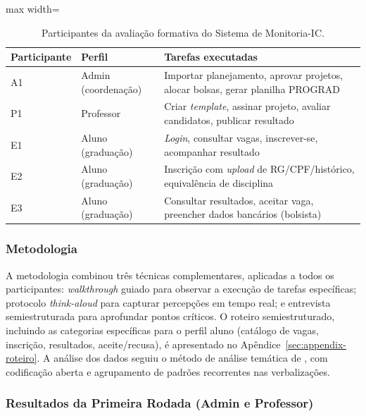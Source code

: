 \documentclass[portuguese]{sbc2025}%
\begin{document}
\begin{table}[!htbp]
  \centering
  \small
  \caption{Participantes da avaliação formativa do Sistema de Monitoria-IC.}
  \label{tab:participantes}
  \begin{adjustbox}{max width=\columnwidth}
    \begin{tabular}{|l|l|p{4.3cm}|}
      \hline
      \textbf{Participante} & \textbf{Perfil} & \textbf{Tarefas executadas} \\
      \hline
      A1 & Admin (coordenação) & Importar planejamento, aprovar projetos, alocar bolsas, gerar planilha PROGRAD \\ \hline
      P1 & Professor & Criar \textit{template}, assinar projeto, avaliar candidatos, publicar resultado \\ \hline
      E1 & Aluno (graduação) & \textit{Login}, consultar vagas, inscrever-se, acompanhar resultado \\ \hline
      E2 & Aluno (graduação) & Inscrição com \textit{upload} de RG/CPF/histórico, equivalência de disciplina \\ \hline
      E3 & Aluno (graduação) & Consultar resultados, aceitar vaga, preencher dados bancários (bolsista) \\ \hline
    \end{tabular}
  \end{adjustbox}
\end{table}

\subsubsection{Metodologia}

A metodologia combinou três técnicas complementares, aplicadas a todos os participantes: \textit{walkthrough} guiado para observar a execução de tarefas específicas; protocolo \textit{think-aloud} para capturar percepções em tempo real; e entrevista semiestruturada para aprofundar pontos críticos. O roteiro semiestruturado, incluindo as categorias específicas para o perfil aluno (catálogo de vagas, inscrição, resultados, aceite/recusa), é apresentado no Apêndice~\ref{sec:appendix-roteiro}. A análise dos dados seguiu o método de análise temática de \citet{braun2006using}, com codificação aberta e agrupamento de padrões recorrentes nas verbalizações.

\subsubsection{Resultados da Primeira Rodada (Admin e Professor)}
\end{document}
